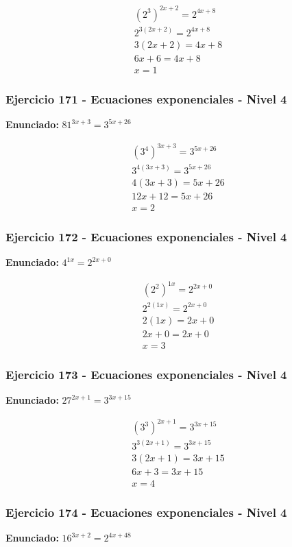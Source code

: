 \documentclass[12pt,a4paper]{article}
\begin{document}
\[
\begin{aligned}
(2^{3})^{2x+2}=2^{4x+8}\\
2^{3(2x+2)}=2^{4x+8}\\
3(2x+2)=4x+8\\
6x+6=4x+8\\
\boxed{x=1}
\end{aligned}
\]


\subsubsection*{Ejercicio 171 - Ecuaciones exponenciales - Nivel 4}
\textbf{Enunciado:} \(81^{3x+3}=3^{5x+26}\)

\[
\begin{aligned}
(3^{4})^{3x+3}=3^{5x+26}\\
3^{4(3x+3)}=3^{5x+26}\\
4(3x+3)=5x+26\\
12x+12=5x+26\\
\boxed{x=2}
\end{aligned}
\]


\subsubsection*{Ejercicio 172 - Ecuaciones exponenciales - Nivel 4}
\textbf{Enunciado:} \(4^{1x}=2^{2x+0}\)

\[
\begin{aligned}
(2^{2})^{1x}=2^{2x+0}\\
2^{2(1x)}=2^{2x+0}\\
2(1x)=2x+0\\
2x+0=2x+0\\
\boxed{x=3}
\end{aligned}
\]


\subsubsection*{Ejercicio 173 - Ecuaciones exponenciales - Nivel 4}
\textbf{Enunciado:} \(27^{2x+1}=3^{3x+15}\)

\[
\begin{aligned}
(3^{3})^{2x+1}=3^{3x+15}\\
3^{3(2x+1)}=3^{3x+15}\\
3(2x+1)=3x+15\\
6x+3=3x+15\\
\boxed{x=4}
\end{aligned}
\]


\subsubsection*{Ejercicio 174 - Ecuaciones exponenciales - Nivel 4}
\textbf{Enunciado:} \(16^{3x+2}=2^{4x+48}\)
\end{document}
